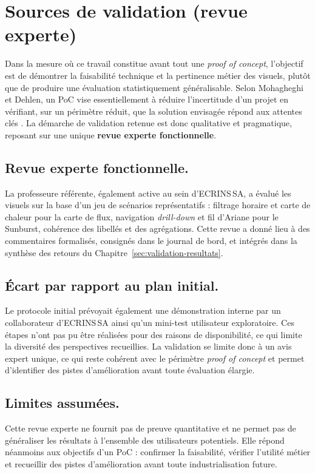 \section{Sources de validation (revue experte)}
\label{sec:validation-sources}

Dans la mesure où ce travail constitue avant tout une \textit{proof of concept}, 
l’objectif est de démontrer la faisabilité technique et la pertinence métier des visuels, 
plutôt que de produire une évaluation statistiquement généralisable. 
Selon Mohagheghi et Dehlen, un PoC vise essentiellement à réduire l’incertitude d’un projet 
en vérifiant, sur un périmètre réduit, que la solution envisagée répond aux attentes clés 
\parencite{MohagheghiPoC2008}. 
La démarche de validation retenue est donc qualitative et pragmatique, 
reposant sur une unique \textbf{revue experte fonctionnelle}.

\subsection{Revue experte fonctionnelle.}
La professeure référente, également active au sein d’ECRINS\,SA, a évalué 
les visuels sur la base d’un jeu de scénarios représentatifs : filtrage horaire 
et carte de chaleur pour la carte de flux, navigation \textit{drill-down} 
et fil d’Ariane pour le Sunburst, cohérence des libellés et des agrégations. 
Cette revue a donné lieu à des commentaires formalisés, consignés dans le journal de bord, 
et intégrés dans la synthèse des retours du Chapitre~\ref{sec:validation-resultats}. 

\subsection{Écart par rapport au plan initial.}
Le protocole initial prévoyait également une démonstration interne 
par un collaborateur d’ECRINS\,SA ainsi qu’un mini-test utilisateur exploratoire. 
Ces étapes n’ont pas pu être réalisées pour des raisons de disponibilité, 
ce qui limite la diversité des perspectives recueillies. 
La validation se limite donc à un avis expert unique, 
ce qui reste cohérent avec le périmètre \textit{proof of concept} 
et permet d’identifier des pistes d’amélioration 
avant toute évaluation élargie.

\subsection{Limites assumées.}
Cette revue experte ne fournit pas de preuve quantitative et ne permet pas 
de généraliser les résultats à l’ensemble des utilisateurs potentiels. 
Elle répond néanmoins aux objectifs d’un PoC : confirmer la faisabilité, 
vérifier l’utilité métier et recueillir des pistes d’amélioration 
avant toute industrialisation future.
